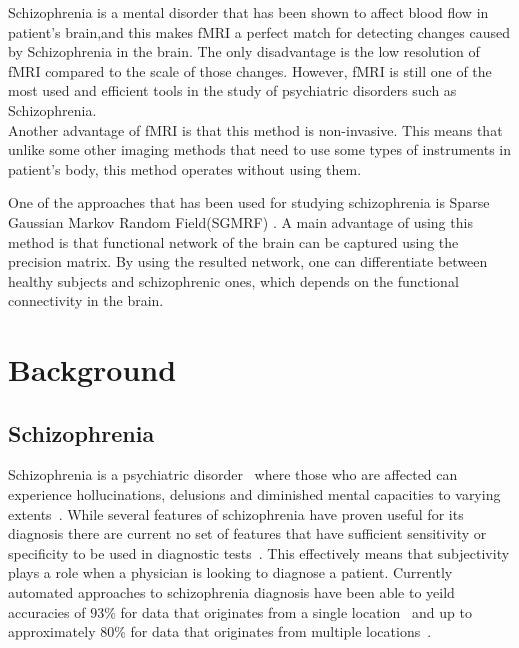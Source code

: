 \documentclass{article} %
\begin{document}
Schizophrenia is a mental disorder that has been shown to affect blood flow in patient's brain\cite{Kenji_2010},and this makes fMRI a perfect match for detecting changes caused by Schizophrenia in the brain. The only disadvantage is the low resolution of fMRI compared to the scale of those changes. However, fMRI is still one of the most used and efficient tools in the study of psychiatric disorders such as Schizophrenia.   \\

Another advantage of fMRI is that this method is non-invasive. This means that unlike some other imaging methods that need to use some types of instruments in patient's body, this method operates without using them. 

One of the approaches that has been used for studying schizophrenia is Sparse Gaussian Markov Random Field(SGMRF) \cite{Rish_2013}\cite{Rosa_2013}. A main advantage of using this method is that functional network of the brain can be captured using the precision matrix. \cite{Rish_2013} 
By using the resulted network, one can differentiate between healthy subjects and schizophrenic ones, which depends on the functional connectivity in the brain.      


\section{Background}

\subsection{Schizophrenia}
Schizophrenia is a psychiatric disorder~\cite{Rish_2013} where those who are 
affected can experience hollucinations, delusions and diminished mental 
capacities to varying extents~\cite{jablensky2010diagnostic}. While several
features of schizophrenia have proven useful for its diagnosis there are
current no set of features that have sufficient sensitivity or specificity
to be used in diagnostic tests~\cite{jablensky2010diagnostic}. This 
effectively means that subjectivity plays a role when a physician is
looking to diagnose a patient. Currently automated approaches to schizophrenia
diagnosis have  been able to yeild accuracies of $93\%$ for data that 
originates from a single location~\cite{Rish_2013} and up to approximately 
$80\%$ for data that originates from multiple locations~\cite{Cheng2015}.
\end{document}
